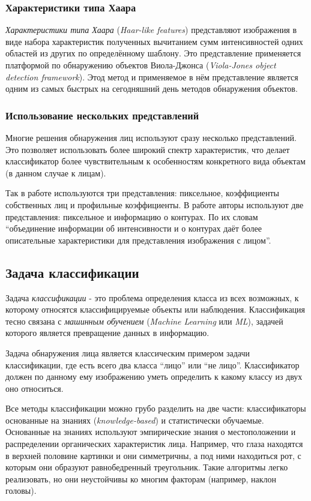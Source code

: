 \documentclass[12pt]{report}
\begin{document}
\subsubsection{Характеристики типа Хаара}
\emph{Характеристики типа Хаара} (\textit{Haar-like features}) представляют изображения в виде набора характеристик 
полученных вычитанием сумм интенсивностей одних областей из других по определённому шаблону. Это представление 
применяется платформой по обнаружению объектов Виола-Джонса (\textit{Viola-Jones object detection 
framework}). \citep{viola2001rapid} Этод метод и применяемое в нём представление является одним из самых быстрых на 
сегодняшний день методов обнаружения объектов.

\subsubsection{Использование нескольких представлений}
Многие решения обнаружения лиц используют сразу несколько представлений. Это позволяет использовать более широкий 
спектр характеристик, что делает классификатор более чувствительным к особенностям конкретного вида объектам (в 
данном случае к лицам).

Так в работе \citep{bojkovic2006face} используются три представления: пиксельное, коэффициенты собственных лиц и 
профильные коэффициенты. В работе \citep{ahmadyfard2008hierarchical} авторы используют две представления: 
пиксельное и 
информацию о контурах. По их словам ``объединение информации об интенсивности и о контурах даёт более описательные 
характеристики для представления изображения с лицом''.

\subsection{Задача классификации}
\label{classficators}
Задача \emph{классификации} - это проблема определения класса из всех возможных, к которому относятся 
классифицируемые объекты или наблюдения. Классификация тесно связана с \emph{машинным обучением} (\textit{Machine 
Learning} или \textit{ML}), задачей которого является превращение данных в информацию. \citep{bradski2008learning}

Задача обнаружения лица является классическим примером задачи классификации, где есть всего два класса ``лицо'' или 
``не лицо''. Классификатор должен по данному ему изображению уметь определить к какому классу из двух оно 
относиться.

Все методы классификации можно грубо разделить на две части: классификаторы основанные на знаниях (\textit
{knowledge-based}) и 
статистически обучаемые. Основанные на знаниях используют эмпирические знания о местоположении и распределении 
органических характеристик лица. \citep{bojkovic2006face} Например, что глаза находятся в верхней половине 
картинки и они симметричны, а под ними находиться рот, с которым они образуют равнобедренный треугольник. Такие 
алгоритмы легко реализовать, но они неустойчивы ко многим факторам (например, наклон головы).
\end{document}
